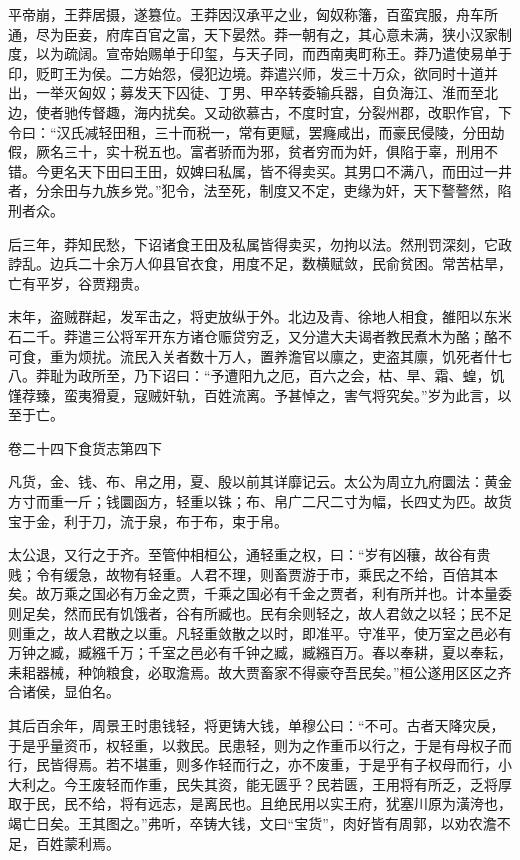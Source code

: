 \documentclass[12pt,UTF8]{ctexbook}
\begin{document}
平帝崩，王莽居摄，遂篡位。王莽因汉承平之业，匈奴称籓，百蛮宾服，舟车所通，尽为臣妾，府库百官之富，天下晏然。莽一朝有之，其心意未满，狭小汉家制度，以为疏阔。宣帝始赐单于印玺，与天子同，而西南夷町称王。莽乃遣使易单于印，贬町王为侯。二方始怨，侵犯边境。莽遣兴师，发三十万众，欲同时十道并出，一举灭匈奴；募发天下囚徒、丁男、甲卒转委输兵器，自负海江、淮而至北边，使者驰传督趣，海内扰矣。又动欲慕古，不度时宜，分裂州郡，改职作官，下令曰：“汉氏减轻田租，三十而税一，常有更赋，罢癃咸出，而豪民侵陵，分田劫假，厥名三十，实十税五也。富者骄而为邪，贫者穷而为奸，俱陷于辜，刑用不错。今更名天下田曰王田，奴婢曰私属，皆不得卖买。其男口不满八，而田过一井者，分余田与九族乡党。”犯令，法至死，制度又不定，吏缘为奸，天下謷謷然，陷刑者众。



后三年，莽知民愁，下诏诸食王田及私属皆得卖买，勿拘以法。然刑罚深刻，它政誖乱。边兵二十余万人仰县官衣食，用度不足，数横赋敛，民俞贫困。常苦枯旱，亡有平岁，谷贾翔贵。



末年，盗贼群起，发军击之，将吏放纵于外。北边及青、徐地人相食，雒阳以东米石二千。莽遣三公将军开东方诸仓赈贷穷乏，又分遣大夫谒者教民煮木为酪；酪不可食，重为烦扰。流民入关者数十万人，置养澹官以廪之，吏盗其廪，饥死者什七八。莽耻为政所至，乃下诏曰：“予遭阳九之厄，百六之会，枯、旱、霜、蝗，饥馑荐臻，蛮夷猾夏，寇贼奸轨，百姓流离。予甚悼之，害气将究矣。”岁为此言，以至于亡。





卷二十四下食货志第四下



凡货，金、钱、布、帛之用，夏、殷以前其详靡记云。太公为周立九府圜法：黄金方寸而重一斤；钱圜函方，轻重以铢；布、帛广二尺二寸为幅，长四丈为匹。故货宝于金，利于刀，流于泉，布于布，束于帛。



太公退，又行之于齐。至管仲相桓公，通轻重之权，曰：“岁有凶穰，故谷有贵贱；令有缓急，故物有轻重。人君不理，则畜贾游于市，乘民之不给，百倍其本矣。故万乘之国必有万金之贾，千乘之国必有千金之贾者，利有所并也。计本量委则足矣，然而民有饥饿者，谷有所臧也。民有余则轻之，故人君敛之以轻；民不足则重之，故人君散之以重。凡轻重敛散之以时，即准平。守准平，使万室之邑必有万钟之臧，臧繦千万；千室之邑必有千钟之臧，臧繦百万。春以奉耕，夏以奉耘，耒耜器械，种饷粮食，必取澹焉。故大贾畜家不得豪夺吾民矣。”桓公遂用区区之齐合诸侯，显伯名。



其后百余年，周景王时患钱轻，将更铸大钱，单穆公曰：“不可。古者天降灾戾，于是乎量资币，权轻重，以救民。民患轻，则为之作重币以行之，于是有母权子而行，民皆得焉。若不堪重，则多作轻而行之，亦不废重，于是乎有子权母而行，小大利之。今王废轻而作重，民失其资，能无匮乎？民若匮，王用将有所乏，乏将厚取于民，民不给，将有远志，是离民也。且绝民用以实王府，犹塞川原为潢洿也，竭亡日矣。王其图之。”弗听，卒铸大钱，文曰“宝货”，肉好皆有周郭，以劝农澹不足，百姓蒙利焉。
\end{document}
